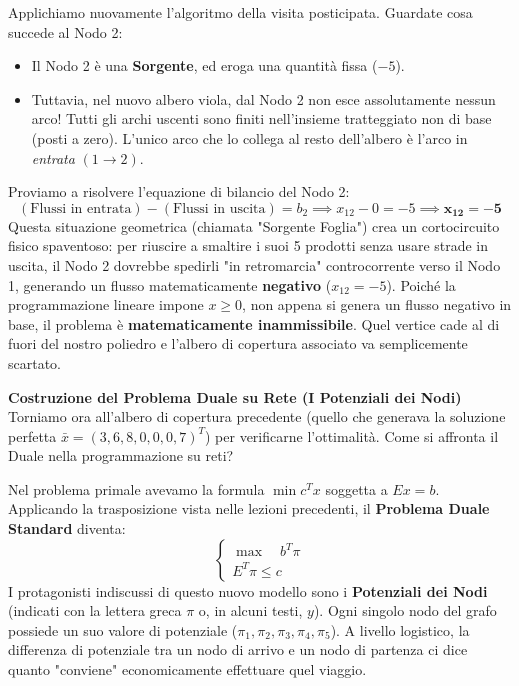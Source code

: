 \documentclass[12pt, a4paper]{article}
\newcommand{\separatore}{\noindent{\color{titlecolor!50}\rule{\textwidth}{0.6pt}}}
\begin{document}
	Applichiamo nuovamente l'algoritmo della visita posticipata. Guardate cosa succede al Nodo 2:
	\begin{itemize}[label=$\circ$, itemsep=2pt, leftmargin=1.5cm]
		\item Il Nodo 2 è una \textbf{Sorgente}, ed eroga una quantità fissa ($-5$). 
		\item Tuttavia, nel nuovo albero viola, dal Nodo 2 non esce assolutamente nessun arco! Tutti gli archi uscenti sono finiti nell'insieme tratteggiato non di base (posti a zero). L'unico arco che lo collega al resto dell'albero è l'arco in \textit{entrata} $(1\to2)$.
	\end{itemize}
	Proviamo a risolvere l'equazione di bilancio del Nodo 2:
	\[ (\text{Flussi in entrata}) - (\text{Flussi in uscita}) = b_2 \implies x_{12} - 0 = -5 \implies \mathbf{x_{12} = -5} \]
	Questa situazione geometrica (chiamata "Sorgente Foglia") crea un cortocircuito fisico spaventoso: per riuscire a smaltire i suoi 5 prodotti senza usare strade in uscita, il Nodo 2 dovrebbe spedirli "in retromarcia" controcorrente verso il Nodo 1, generando un flusso matematicamente \textbf{negativo} ($x_{12} = -5$).
	Poiché la programmazione lineare impone $x \geq 0$, non appena si genera un flusso negativo in base, il problema è \textbf{matematicamente inammissibile}. Quel vertice cade al di fuori del nostro poliedro e l'albero di copertura associato va semplicemente scartato.
	
	\vspace{0.6cm}
	\separatore
	\vspace{0.4cm}
	
	\textbf{Costruzione del Problema Duale su Rete (I Potenziali dei Nodi)}\\
	Torniamo ora all'albero di copertura precedente (quello che generava la soluzione perfetta $\bar{x} = (3, 6, 8, 0, 0, 0, 7)^T$) per verificarne l'ottimalità. Come si affronta il Duale nella programmazione su reti? 
	
	Nel problema primale avevamo la formula $\min c^T x$ soggetta a $Ex = b$. 
	Applicando la trasposizione vista nelle lezioni precedenti, il \textbf{Problema Duale Standard} diventa:
	\[
	\begin{cases}
		\max \quad b^T \pi \\
		E^T \pi \leq c
	\end{cases}
	\]
	I protagonisti indiscussi di questo nuovo modello sono i \textbf{Potenziali dei Nodi} (indicati con la lettera greca $\pi$ o, in alcuni testi, $y$). Ogni singolo nodo del grafo possiede un suo valore di potenziale ($\pi_1, \pi_2, \pi_3, \pi_4, \pi_5$). 
	A livello logistico, la differenza di potenziale tra un nodo di arrivo e un nodo di partenza ci dice quanto "conviene" economicamente effettuare quel viaggio.
	
\end{document}
